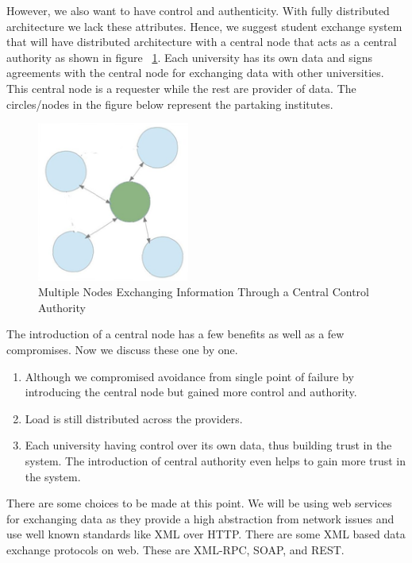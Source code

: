 \documentclass[12pt,a4paper,oneside]{book}
\begin{document}
However, we also want to have control and authenticity. With fully distributed architecture we lack these attributes. Hence, we suggest student exchange system that will have distributed architecture with a central node that acts as a central authority as shown in figure ~\ref{fig:architecture_distributed_exchange_through_hec}. Each university has its own data and signs agreements with the central node for exchanging data with other universities. This central node is a requester while the rest are provider of data. The circles/nodes in the figure below represent the partaking institutes. \\

\begin{figure}[!htp]
  \centering
  \includegraphics[width=5cm]{architecture_distributed_exchange_through_hec.png}
  \caption{Multiple Nodes Exchanging Information Through a Central Control Authority}
  \label{fig:architecture_distributed_exchange_through_hec}
\end{figure}

The introduction of a central node has a few benefits as well as a few compromises. Now we discuss these one by one.

\begin{enumerate}
\item Although we compromised avoidance from single point of failure by introducing the central node but gained more control and authority. 
\item Load is still distributed across the providers.
\item Each university having control over its own data, thus building trust in the system. The introduction of central authority even helps to gain more trust in the system.
\end{enumerate}

There are some choices to be made at this point. We will be using web services for exchanging data as they provide a high abstraction from network issues and use well known standards like XML over HTTP. There are some XML based data exchange protocols on web. These are XML-RPC, SOAP, and REST. \\
\end{document}
